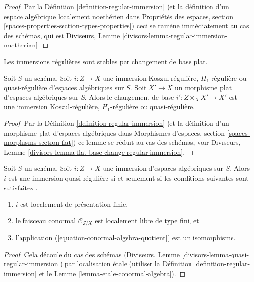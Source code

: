 \begin{proof}
Par la Définition \ref{definition-regular-immersion}
(et la définition d'un espace algébrique localement noethérien
dans Propriétés des espaces, section
\ref{spaces-properties-section-types-properties})
ceci se ramène immédiatement au cas des schémas, qui est
Diviseurs, Lemme \ref{divisors-lemma-regular-immersion-noetherian}.
\end{proof}

\begin{lemma}
\label{lemma-flat-base-change-regular-immersion}
\begin{slogan}
Les immersions régulières sont stables par changement de base plat.
\end{slogan}
Soit $S$ un schéma. Soit $i : Z \to X$ une immersion Koszul-régulière,
$H_1$-régulière ou quasi-régulière d'espaces algébriques sur $S$.
Soit $X' \to X$ un morphisme plat d'espaces algébriques sur $S$.
Alors le changement de base $i' : Z \times_X X' \to X'$ est une immersion
Koszul-régulière, $H_1$-régulière ou quasi-régulière.
\end{lemma}

\begin{proof}
Par la Définition \ref{definition-regular-immersion}
(et la définition d'un morphisme plat d'espaces algébriques
dans Morphismes d'espaces, section
\ref{spaces-morphisms-section-flat})
ce lemme se réduit au cas des schémas, voir
Diviseurs, Lemme \ref{divisors-lemma-flat-base-change-regular-immersion}.
\end{proof}

\begin{lemma}
\label{lemma-quasi-regular-immersion}
Soit $S$ un schéma. Soit $i : Z \to X$ une immersion d'espaces algébriques
sur $S$. Alors $i$ est une immersion quasi-régulière si et seulement si les
conditions suivantes sont satisfaites :
\begin{enumerate}
\item $i$ est localement de présentation finie,
\item le faisceau conormal $\mathcal{C}_{Z/X}$ est localement libre de type fini, et
\item l'application (\ref{equation-conormal-algebra-quotient}) est un isomorphisme.
\end{enumerate}
\end{lemma}

\begin{proof}
Cela découle du cas des schémas
(Diviseurs, Lemme \ref{divisors-lemma-quasi-regular-immersion})
par localisation étale (utiliser la Définition \ref{definition-regular-immersion}
et le
Lemme \ref{lemma-etale-conormal-algebra}).
\end{proof}

